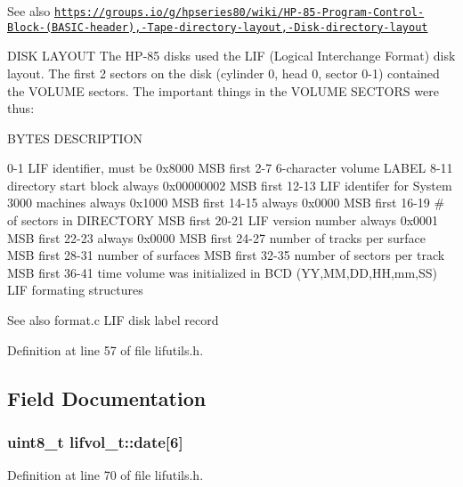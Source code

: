 \begin{DoxySeeAlso}{See also}
\href{https://groups.io/g/hpseries80/wiki/HP-85-Program-Control-Block-(BASIC-header),-Tape-directory-layout,-Disk-directory-layout}{\tt https\+://groups.\+io/g/hpseries80/wiki/\+H\+P-\/85-\/\+Program-\/\+Control-\/\+Block-\/(\+B\+A\+S\+I\+C-\/header),-\/\+Tape-\/directory-\/layout,-\/\+Disk-\/directory-\/layout}
\end{DoxySeeAlso}
D\+I\+SK L\+A\+Y\+O\+UT The H\+P-\/85 disks used the L\+IF (Logical Interchange Format) disk layout. The first 2 sectors on the disk (cylinder 0, head 0, sector 0-\/1) contained the V\+O\+L\+U\+ME sectors. The important things in the V\+O\+L\+U\+ME S\+E\+C\+T\+O\+RS were thus\+:

B\+Y\+T\+ES D\+E\+S\+C\+R\+I\+P\+T\+I\+ON 

 0-\/1 L\+IF identifier, must be 0x8000 M\+SB first 2-\/7 6-\/character volume L\+A\+B\+EL 8-\/11 directory start block always 0x00000002 M\+SB first 12-\/13 L\+IF identifer for System 3000 machines always 0x1000 M\+SB first 14-\/15 always 0x0000 M\+SB first 16-\/19 \# of sectors in D\+I\+R\+E\+C\+T\+O\+RY M\+SB first 20-\/21 L\+IF version number always 0x0001 M\+SB first 22-\/23 always 0x0000 M\+SB first 24-\/27 number of tracks per surface M\+SB first 28-\/31 number of surfaces M\+SB first 32-\/35 number of sectors per track M\+SB first 36-\/41 time volume was initialized in B\+CD (YY,MM,DD,HH,mm,SS) L\+IF formating structures \begin{DoxySeeAlso}{See also}
format.\+c L\+IF disk label record 
\end{DoxySeeAlso}


Definition at line 57 of file lifutils.\+h.



\subsection{Field Documentation}
\subsubsection[{\texorpdfstring{date}{date}}]{\setlength{\rightskip}{0pt plus 5cm}uint8\+\_\+t lifvol\+\_\+t\+::date\mbox{[}6\mbox{]}}\hypertarget{structlifvol__t_a41f630e7211326270dc6e72a55f94516}{}\label{structlifvol__t_a41f630e7211326270dc6e72a55f94516}


Definition at line 70 of file lifutils.\+h.



